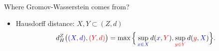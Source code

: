 \documentclass{beamer}
\begin{document}
\begin{frame}{Where Gromov-Wasserstein comes from?}
\scriptsize
\begin{minipage}[t]{0.6\linewidth}
  \begin{itemize}
    \item Hausdorff distance: $X, Y \subset (Z, d)$
    \vspace{-0.3cm}
    \begin{align*}
      d_{H}^{Z}\big( {\color{blue}{(X, d)}}, {\color{red}{(Y, d)}} \big)
      = \max \Big\{ \sup_{{\color{blue}{x \in X}}} d({\color{blue}{x}}, {\color{red}{Y}}),
      \sup_{{\color{red}{y \in Y}}} d({\color{red}{y}}, {\color{blue}{X}}) \Big\}.
    \end{align*}


\end{itemize}
\end{minipage}
\end{frame}
\end{document}
